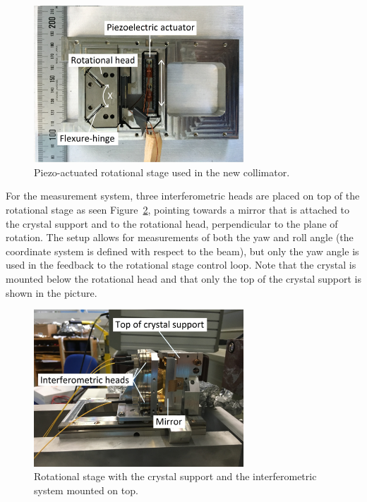 \begin{figure}[h!]
  \centering
  \includegraphics[width=0.7\textwidth]{fig/rotational-stage.jpg}
  \caption{\label{fig:rotationalstage} Piezo-actuated rotational stage used in the new collimator.}
\end{figure}

For the measurement system, three interferometric heads are placed on top of the rotational stage as seen Figure~\ref{fig:rotationalstage-side}, pointing towards a mirror that is attached to the crystal support and to the rotational head, perpendicular to the plane of rotation. The setup allows for measurements of both the yaw and roll angle (the coordinate system is defined with respect to the beam), but only the yaw angle is used in the feedback to the rotational stage control loop. Note that the crystal is mounted below the rotational head and that only the top of the crystal support is shown in the picture.

\begin{figure}[h!]
  \centering
  \includegraphics[width=0.7\textwidth]{fig/rotational-stage-interferometer.jpg}
  \caption{\label{fig:rotationalstage-side} Rotational stage with the crystal support and the interferometric system mounted on top.}
\end{figure}

